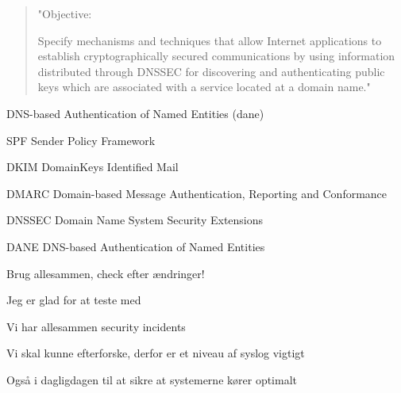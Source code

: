 \documentclass[Screen16to9,17pt]{foils}
\begin{document}

\begin{quote}
"Objective:

Specify mechanisms and techniques that allow Internet applications to
establish cryptographically secured communications by using information
distributed through DNSSEC for discovering and authenticating public
keys which are associated with a service located at a domain name."
\end{quote}

\begin{list1}
\item DNS-based Authentication of Named Entities (dane)
\end{list1}



\begin{list2}
\item SPF Sender Policy Framework\\ {\footnotesize{}}
\item DKIM DomainKeys Identified Mail\\
{\footnotesize{}}
\item DMARC Domain-based Message Authentication, Reporting and Conformance\\
{\footnotesize{}}
\item DNSSEC Domain Name System Security Extensions\\ {\footnotesize{}}
\item DANE DNS-based Authentication of Named Entities\\ {\footnotesize{}}
\item Brug allesammen, check efter ændringer!
\end{list2}

\centerline{Jeg er glad for at teste med }



\begin{list2}
\item Vi har allesammen security incidents
\item Vi skal kunne efterforske, derfor er et niveau af syslog vigtigt
\item Også i dagligdagen til at sikre at systemerne kører optimalt
\end{list2}
\end{document}
